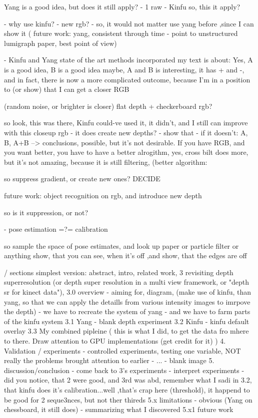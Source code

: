 Yang is a good idea, but does it still apply?
    - 1 raw
    - Kinfu
    so, this it apply?
    
    - why use kinfu? - new rgb?
    - so, it would not matter use yang before ,since I can show it ( future work:  yang, consistent through time - point to unstructured lumigraph paper, best point of view)
    
- Kinfu and Yang state of the art methods incorporated
my text is about: Yes, A is a good idea, B is a good idea maybe, A and B is interesting, it has + and -, and in fact, there is now a more complicated outcome, because I'm in a position to (or show) that I can get a closer RGB 

(random noise, or brighter is closer)
flat depth + checkerboard rgb?

so look, this was there, Kinfu could-ve used it, it didn't, and I still can improve with this closeup rgb
- it does create new depths? - show that
- if it doesn't: A, B, A+B --> conclusions, possible, but it's not desirable. If you have RGB, and you want better, you have to have a better alrogithm, yes, cross bilt does more, but it's not amazing, because it is still filtering, (better algorithm: 

so suppress gradient, or create new ones? DECIDE

future work: object recognition on rgb, and introduce new depth

so is it suppression, or not?


- pose estimation =?= calibration



so sample the space of pose estimates, and look up paper
    or particle filter
    or anything
    show, that you can see, when it's off ,and show, that the edges are off
    
   
    
    
/ sections
simplest version: abstract, intro, related work, 
3 revisiting depth superresolution (or depth super resolution in a multi view framework, or "depth sr for kinect data"), 
3.0 overview - aiming for, diagram, (make use of kinfu, than yang, so that we can apply the detaills from various intensity images to imrpove the depth)
    - we have to recreate the system of yang
    - and we have to farm parts of the kinfu system
3.1 Yang
    - blank depth experiment
3.2 Kinfu
    - kinfu default overlay
3.3 My combined pipleine ( this is what I did, to get the data fro mhere to there. Draw attention to GPU implementations (get credit for it) )
4. Validation / experiments
    - controlled experiments, testing one variable, NOT really the problems brought attention to earlier
    - ...
    - blank image
5. discussion/conclusion
    - come back to 3's experiments
    - interpret experiments
    - did you notice, that 2 were good, and 3rd was abd, remember what I sadi in
3.2, that kinfu does it's calibration...well ,that's crap here (threshold), it happend to be good for 2 seque3nces, but not ther thireds
    5.x limitations
        - obvious (Yang on chessboard, it still does)
        - summarizing what I discovered
    5.x1 future work
        
